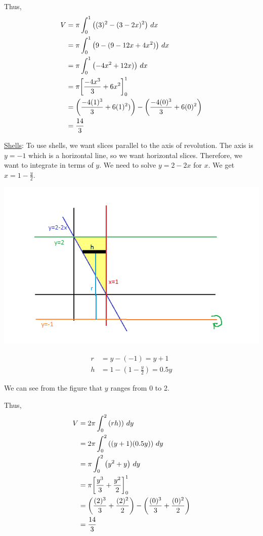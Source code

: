 \documentclass[handout]{ximera}
\begin{document}
\begin{problem}
\begin{freeResponse}
Thus, 
\begin{align*}
V &= \pi \int_0^1 \left( (3)^2 - (3 - 2x)^2 \right) \,d x \\
&= \pi \int_0^1 \left( 9 - (9 -12x + 4x^2) \right) \,d x \\
&= \pi \int_0^1 \left(- 4x^2+12x ) \right) \,d x \\
&= \pi \bigg[ \frac{-4x^3}{3}+6x^2 \bigg]_0^1 \\
&= \left(\frac{-4(1)^3}{3}+6(1)^2) \right) - \left(\frac{-4(0)^3}{3}+6(0)^2 \right)\\
&= \frac{14}{3}
\end{align*}

\underline{Shells}:  To use shells, we want slices parallel to the axis of revolution.  The axis is $y=-1$ which is a horizontal line, so we want horizontal slices.  Therefore, we want to integrate in terms of $y$.  We need to solve $y=2-2x$ for $x$.  We get $x=1-\frac{y}{2}$.

\begin{image}
\includegraphics{Figure6-4-12.png}
\end{image}

\begin{align*}
r &= y - (-1) = y+1 \\
h &= 1 - (1-\frac{y}{2}) = 0.5y
\end{align*}

We can see from the figure that $y$ ranges from 0 to 2.

Thus, 
\begin{align*}
V &= 2\pi \int_0^2 \left( rh) \right) \,d y \\
&= 2\pi \int_0^2 \left( (y+1)(0.5y) \right) \,d y \\
&= \pi \int_0^2 \left( y^2 + y \right) \,d y \\
&= \pi \bigg[ \frac{y^3}{3}+\frac{y^2}{2}  \bigg]_0^1 \\
&= \left(\frac{(2)^3}{3}+\frac{(2)^2}{2} \right) - \left(\frac{(0)^3}{3}+\frac{(0)^2}{2} \right)\\
&= \frac{14}{3}
\end{align*}

	\end{freeResponse}

\end{problem}
\end{document}
